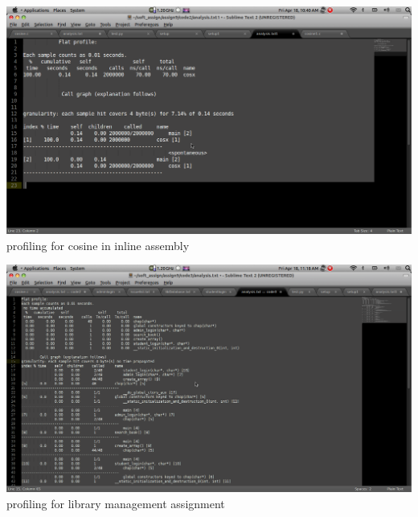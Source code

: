\documentclass[a4paper,12pt]{report}
\begin{document}
\begin{center}
 \includegraphics[width=13 cm,height=12 cm]{./cosine1.png}
profiling for cosine in inline assembly
\end{center}
\begin{center}
 \includegraphics[width=13 cm,height=12 cm]{./library.png}
profiling for library management assignment
\end{center}
\end{document}
